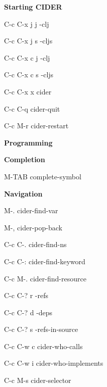 \documentclass[a4paper,10pt]{article}
\renewcommand\section[1]{\bigskip\par\textbf{\large#1}\medskip}
\renewcommand\subsection[1]{\medskip\par\textbf{#1}\medskip}
\newcommand\keyify[1]{\keys{\ttfamily#1}}
\begin{document}
\begin{multicols}{2}

\section{Starting CIDER}
\begin{keylist}[labelwidth=\widthof{\keyify{C-c C-x j j}}]
  \item[C-c C-x j j] -clj
  \item[C-c C-x j s] \ns             -cljs
  \item[C-c C-x c j] -clj
  \item[C-c C-x c s] \ns             -cljs
  \item[C-c C-x x] cider
  \item[C-c C-q] cider-quit
  \item[C-c M-r] cider-restart
\end{keylist}

\section{Programming}
\subsection{Completion}
\begin{keylist}[labelwidth=\widthof{\keyify{C-c C-? r}}]
  \item[M-TAB] complete-symbol
\end{keylist}

\subsection{Navigation}
\begin{keylist}[labelwidth=\widthof{\keyify{C-c C-? r}}]
  \item[M-.] cider-find-var
  \item[M-,] cider-pop-back
  \item[C-c C-.] cider-find-ns
  \item[C-c C-:] cider-find-keyword
  \item[C-c M-.] cider-find-resource
  \item[C-c C-? r] -refs
  \item[C-c C-? d] \ns            -deps
  \item[C-c C-? s] \ns            -refs-in-source
  \item[C-c C-w c] cider-who-calls
  \item[C-c C-w i] cider-who-implements
  \item[C-c M-s] cider-selector
\end{keylist}


\end{multicols}
\end{document}
